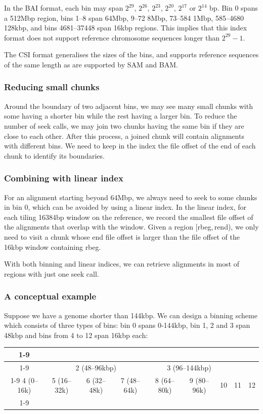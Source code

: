 \documentclass[10pt]{article}
\begin{document}
In the BAI format, each bin may span $2^{29}$, $2^{26}$, $2^{23}$, $2^{20}$,
$2^{17}$ or $2^{14}$ bp. Bin 0 spans a 512Mbp region, bins 1--8 span 64Mbp,
9--72 8Mbp, 73--584 1Mbp, 585--4680 128kbp, and bins 4681--37448 span 16kbp
regions.  This implies that this index format does not support reference
chromosome sequences longer than $2^{29}-1$.

The CSI format generalises the sizes of the bins, and supports reference
sequences of the same length as are supported by SAM and BAM.

\subsubsection{Reducing small chunks}
Around the boundary of two adjacent bins, we may see many small chunks
with some having a shorter bin while the rest having a larger bin. To
reduce the number of seek calls, we may join two chunks having the same
bin if they are close to each other. After this process, a joined chunk
will contain alignments with different bins. We need to keep in the
index the file offset of the end of each chunk to identify its
boundaries.

\subsubsection{Combining with linear index}
For an alignment starting beyond 64Mbp, we always need to seek to some
chunks in bin 0, which can be avoided by using a linear index. In the
linear index, for each tiling 16384bp window on the reference, we record
the smallest file offset of the alignments that overlap with the
window. Given a region [rbeg,\,rend), we only need to visit a chunk whose
end file offset is larger than the file offset of the 16kbp window
containing rbeg.

With both binning and linear indices, we can retrieve alignments in most
of regions with just one seek call.

\subsubsection{A conceptual example}
Suppose we have a genome shorter than 144kbp. We can design a binning
scheme which consists of three types of bins: bin 0 spans 0-144kbp, bin
1, 2 and 3 span 48kbp and bins from 4 to 12 span 16kbp each:

\begin{table}[ht]
  \centering
  {\small\begin{tabular}{|c|c|c|c|c|c|c|c|c|}
    \cline{1-9}
    \multicolumn{9}{|c|}{0 (0--144kbp)}\\\cline{1-9}
    \multicolumn{3}{|c|}{1 (0--48kbp)} & \multicolumn{3}{c|}{2 (48--96kbp)} & \multicolumn{3}{c|}{3 (96--144kbp)} \\\cline{1-9}
    4 (0--16k) & 5 (16--32k) & 6 (32--48k) & 7 (48--64k) & 8 (64--80k) & 9 (80--96k) & 10 & 11 & 12 \\
    \cline{1-9}
  \end{tabular}}
\end{table}
\end{document}

